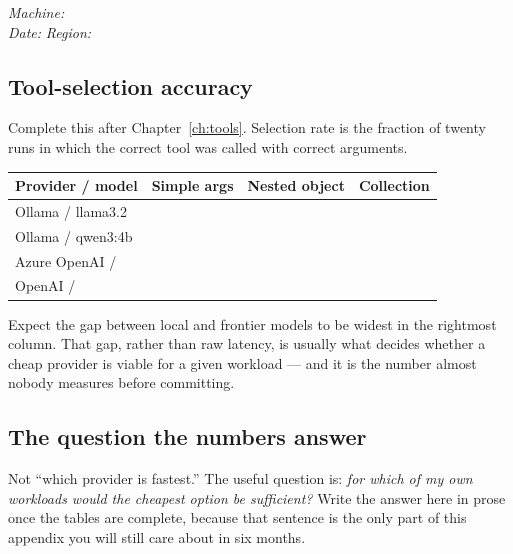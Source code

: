 \emph{Machine:} \dotfill \\
\emph{Date:} \dotfill \qquad \emph{Region:} \dotfill

\subsection{Tool-selection accuracy}

Complete this after Chapter~\ref{ch:tools}. Selection rate is the fraction of
twenty runs in which the correct tool was called with correct arguments.

\begin{center}
\small
\begin{tabularx}{\linewidth}{@{}Xrrr@{}}
\toprule
\textbf{Provider / model} & \textbf{Simple args} & \textbf{Nested object} & \textbf{Collection} \\
\midrule
Ollama / llama3.2 & & & \\
Ollama / qwen3:4b & & & \\
Azure OpenAI / & & & \\
OpenAI / & & & \\
\bottomrule
\end{tabularx}
\end{center}

\begin{note}
Expect the gap between local and frontier models to be widest in the rightmost
column. That gap, rather than raw latency, is usually what decides whether a
cheap provider is viable for a given workload --- and it is the number almost
nobody measures before committing.
\end{note}

\subsection{The question the numbers answer}

Not ``which provider is fastest.'' The useful question is: \emph{for which of my
own workloads would the cheapest option be sufficient?} Write the answer here in
prose once the tables are complete, because that sentence is the only part of
this appendix you will still care about in six months.
